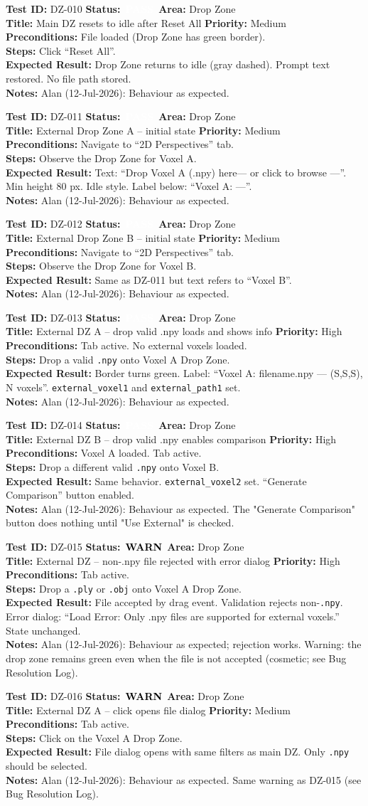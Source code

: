 \documentclass[12pt,a4paper]{article}
\newcommand{\statuspass}{\colorbox{statusgreen}{\textcolor{white}{\textbf{\,PASS\,}}}}
\newcommand{\statuswarn}{\colorbox{statusyellow}{\textcolor{black}{\textbf{\,WARN\,}}}}
\newcommand{\testcase}[9]{%
  \smallskip
  \noindent\textbf{Test ID:} #1 \hfill \textbf{Status:} #2 \hfill \textbf{Area:} #3 \\
  \textbf{Title:} #4 \hfill \textbf{Priority:} #5 \\[0.3em]
  \textbf{Preconditions:} #6 \\[0.3em]
  \textbf{Steps:} #7 \\[0.3em]
  \textbf{Expected Result:} #8 \\
  \textbf{Notes:} #9
  \smallskip
}
\begin{document}
\testcase{DZ-010}{\statuspass}{Drop Zone}{Main DZ resets to idle after Reset All}{Medium}{File loaded (Drop Zone has green border).}{Click ``Reset All''.}{Drop Zone returns to idle (gray dashed). Prompt text restored. No file path stored.}{Alan (12-Jul-2026): Behaviour as expected.}


\testcase{DZ-011}{\statuspass}{Drop Zone}{External Drop Zone A -- initial state}{Medium}{Navigate to ``2D Perspectives'' tab.}{Observe the Drop Zone for Voxel A.}{Text: ``Drop Voxel A (.npy) here--- or click to browse ---''. Min height 80 px. Idle style. Label below: ``Voxel A: ---''.}{Alan (12-Jul-2026): Behaviour as expected.}


\testcase{DZ-012}{\statuspass}{Drop Zone}{External Drop Zone B -- initial state}{Medium}{Navigate to ``2D Perspectives'' tab.}{Observe the Drop Zone for Voxel B.}{Same as DZ-011 but text refers to ``Voxel B''.}{Alan (12-Jul-2026): Behaviour as expected.}


\testcase{DZ-013}{\statuspass}{Drop Zone}{External DZ A -- drop valid .npy loads and shows info}{High}{Tab active. No external voxels loaded.}{Drop a valid \texttt{.npy} onto Voxel A Drop Zone.}{Border turns green. Label: ``Voxel A: filename.npy --- (S,S,S), N voxels''. \texttt{external\_voxel1} and \texttt{external\_path1} set.}{Alan (12-Jul-2026): Behaviour as expected.}


\testcase{DZ-014}{\statuspass}{Drop Zone}{External DZ B -- drop valid .npy enables comparison}{High}{Voxel A loaded. Tab active.}{Drop a different valid \texttt{.npy} onto Voxel B.}{Same behavior. \texttt{external\_voxel2} set. ``Generate Comparison'' button enabled.}{Alan (12-Jul-2026): Behaviour as expected. The "Generate Comparison" button does nothing until "Use External" is checked.}


\testcase{DZ-015}{\statuswarn}{Drop Zone}{External DZ -- non-.npy file rejected with error dialog}{High}{Tab active.}{Drop a \texttt{.ply} or \texttt{.obj} onto Voxel A Drop Zone.}{File accepted by drag event. Validation rejects non-\texttt{.npy}. Error dialog: ``Load Error: Only .npy files are supported for external voxels.'' State unchanged.}{Alan (12-Jul-2026): Behaviour as expected; rejection works. Warning: the drop zone remains green even when the file is not accepted (cosmetic; see Bug Resolution Log).}


\testcase{DZ-016}{\statuswarn}{Drop Zone}{External DZ A -- click opens file dialog}{Medium}{Tab active.}{Click on the Voxel A Drop Zone.}{File dialog opens with same filters as main DZ. Only \texttt{.npy} should be selected.}{Alan (12-Jul-2026): Behaviour as expected. Same warning as DZ-015 (see Bug Resolution Log).}
\end{document}

